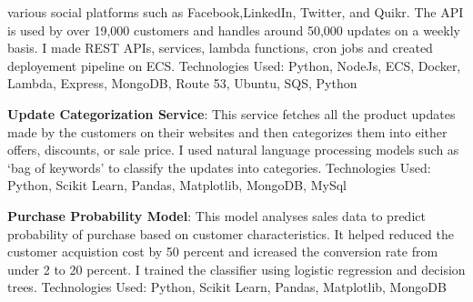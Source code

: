 \begin{cventries}
{\begin{cvitems}
{        various social platforms such as Facebook,LinkedIn, Twitter, and Quikr. The API is used 
        by over 19,000 customers and handles around 50,000 updates on a weekly basis. 
        I made REST APIs, services, lambda functions, cron jobs and created deployement pipeline on 
        ECS. 
        Technologies Used: Python, NodeJs, ECS, Docker, Lambda, Express, MongoDB, Route 53, Ubuntu, SQS, Python}
        \item {\textbf{Update Categorization Service}: This service fetches all the product updates made by the 
        customers on their websites and then categorizes them into either offers, discounts, or sale price. 
        I used natural language processing models such as ‘bag of keywords’ to classify the updates 
        into categories. Technologies Used: Python, Scikit Learn, Pandas, Matplotlib, MongoDB, MySql }
        \item {\textbf{Purchase Probability Model}: This model analyses sales data to predict probability 
        of purchase based on customer characteristics. It helped reduced the customer acquistion cost by 
        50 percent and icreased the conversion rate from under 2 to 20 percent. I trained the classifier using 
        logistic regression and decision trees. 
        Technologies Used: Python, Scikit Learn, Pandas, Matplotlib, MongoDB}
      \end{cvitems}
    }

\end{cventries}